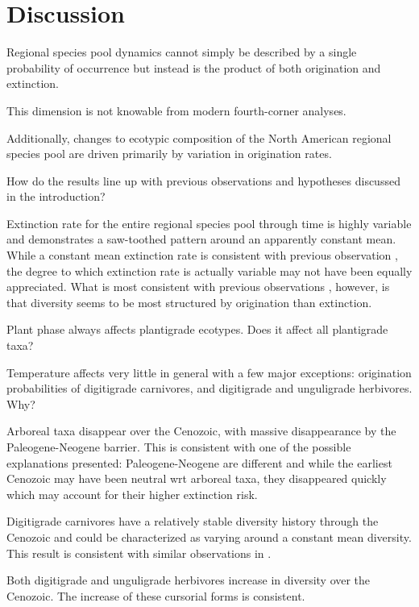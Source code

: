 \documentclass[12pt,letterpaper]{article}
\begin{document}
\section*{Discussion}

Regional species pool dynamics cannot simply be described by a single probability of occurrence but instead is the product of both origination and extinction. 

This dimension is not knowable from modern fourth-corner analyses.

Additionally, changes to ecotypic composition of the North American regional species pool are driven primarily by variation in origination rates.



How do the results line up with previous observations and hypotheses discussed in the introduction? 

Extinction rate for the entire regional species pool through time is highly variable and demonstrates a saw-toothed pattern around an apparently constant mean. While a constant mean extinction rate is consistent with previous observation \citep{Alroy1996a,Alroy2000g}, the degree to which extinction rate is actually variable may not have been equally appreciated. What is most consistent with previous observations \citep{Alroy1996a,Alroy2000g}, however, is that diversity seems to be most structured by origination than extinction.

Plant phase always affects plantigrade ecotypes. Does it affect all plantigrade taxa?

Temperature affects very little in general with a few major exceptions: origination probabilities of digitigrade carnivores, and digitigrade and unguligrade herbivores. Why?

Arboreal taxa disappear over the Cenozoic, with massive disappearance by the Paleogene-Neogene barrier. This is consistent with one of the possible explanations presented: Paleogene-Neogene are different and while the earliest Cenozoic may have been neutral wrt arboreal taxa, they disappeared quickly which may account for their higher extinction risk.

Digitigrade carnivores have a relatively stable diversity history through the Cenozoic and could be characterized as varying around a constant mean diversity. This result is consistent with similar observations in \citet{Slater2015c}.

Both digitigrade and unguligrade herbivores increase in diversity over the Cenozoic. The increase of these cursorial forms is consistent.
\end{document}
